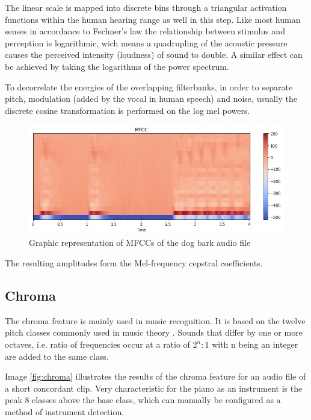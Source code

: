  
 The linear scale is mapped into discrete bins through a triangular activation functions within the human hearing range as well in this step. Like most human senses in accordance to Fechner’s law \cite{fechner1860} the relationship between stimulus and perception is logarithmic, wich means a quadrupling of the acoustic pressure causes the perceived intensity (loudness) of sound to double. A similar effect can be achieved by taking the logarithms of the power spectrum.

 To decorrelate the energies of the overlapping filterbanks, in order to separate pitch, modulation (added by the vocal in human speech) and noise, usually the discrete cosine transformation is performed on the log mel powers. %
  
  \begin{figure}[h]
    \centering
	\includegraphics[width=.9\textwidth]{./images/illustrations/mfcc}
    \caption{Graphic representation of MFCCs of the dog bark audio file}
    \label{fig:mfcc}
\end{figure}
 
 The resulting amplitudes form the Mel-frequency cepstral coefficients.

\subsection{Chroma}

The chroma feature is mainly used in music recognition. It is based on the twelve pitch classes commonly used in music theory \cite{Mller:2015:FMP:2815664}. Sounds that differ by one or more octaves, i.e. ratio of frequencies occur at a ratio of $2^n : 1$ with n being an integer are added to the same class.

Image \ref{fig:chroma} illustrates the results of the chroma feature for an audio file of a short concordant clip. Very characteristic for the piano as an instrument is the peak 8 classes above the base class, which can manually be configured as a method of instrument detection. 


